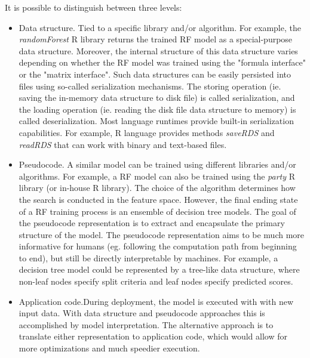 \documentclass[12pt,letterpaper]{article}
\begin{document}
It is possible to distinguish between three levels:
\begin{itemize}
  \item Data structure. Tied to a specific library and/or algorithm.
  For example, the \textit{randomForest} R library returns the trained
  RF model as a special-purpose data structure. Moreover, the internal
  structure of this data structure varies depending on whether the RF
  model was trained using the "formula interface" or the "matrix interface".
  Such data structures can be easily persisted into files using so-called
  serialization mechanisms. The storing operation (ie. saving the in-memory
  data structure to disk file) is called serialization, and the loading
  operation (ie. reading the disk file data structure to memory) is called
  deserialization. Most language runtimes provide built-in serialization
  capabilities. For example, R language provides methods \textit{saveRDS}
  and \textit{readRDS} that can work with binary and text-based files.
  \item Pseudocode. A similar model can be trained using different libraries
  and/or algorithms. For example, a RF model can also be trained using
  the \textit{party} R library (or in-house R library). The choice of the
  algorithm determines how the search is conducted in the feature space. 
  However, the final ending state of a RF training process is an ensemble
  of decision tree models.
  The goal of the pseudocode representation is to extract and encapsulate
  the primary structure of the model. The pseudocode representation aims 
  to be much more informative for humans (eg. following the computation
  path from beginning to end), but still be directly interpretable by 
  machines. For example, a decision tree model could be represented by
  a tree-like data structure, where non-leaf nodes specify split criteria 
  and leaf nodes specify predicted scores.
  \item Application code.During deployment, the model is executed with
  with new input data. With data structure and pseudocode approaches this 
  is accomplished by model interpretation. The alternative approach is to
  translate either representation to application code, which would allow
  for more optimizations and much speedier execution. 
\end{itemize}
\end{document}
